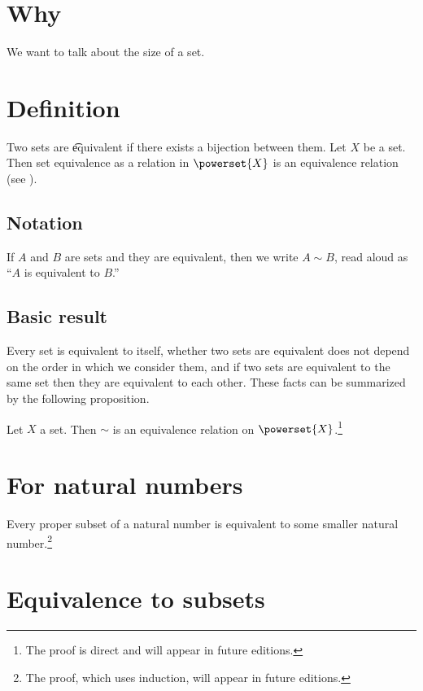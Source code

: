 
\section*{Why}

We want to talk about the size of a set.

\section*{Definition}

Two sets are \t{equivalent} if there exists a bijection between them.
Let $X$ be a set.
Then set equivalence as a relation in $\powerset{X}$ is an equivalence relation (see ).

\subsection*{Notation}

If $A$ and $B$ are sets and they are equivalent, then we write $A \sim B$, read aloud as ``$A$ is equivalent to $B$.''

\subsection*{Basic result}

Every set is equivalent to itself, whether two sets are equivalent does not depend on the order in which we consider them, and if two sets are equivalent to the same set then they are equivalent to each other.
These facts can be summarized by the following proposition.

\begin{proposition}
Let $X$ a set. Then $\sim$ is an equivalence relation on $\powerset{X}$.\footnote{The proof is direct and will appear in future editions.}
\end{proposition}

\section*{For natural numbers}

\begin{proposition}
Every proper subset of a natural number is equivalent to some smaller natural number.\footnote{The proof, which uses induction, will appear in future editions.}
\end{proposition}

\section*{Equivalence to subsets}

